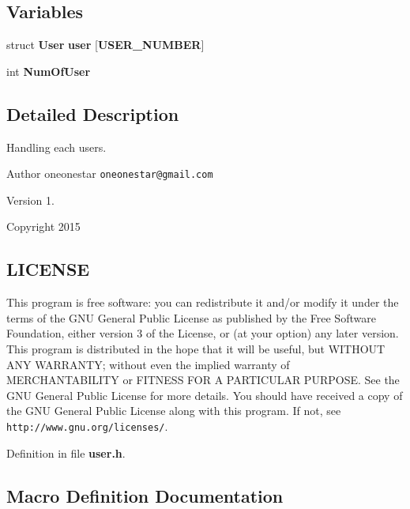 \subsection*{Variables}
\begin{DoxyCompactItemize}
\item 
struct {\bf User} {\bf user} [{\bf U\+S\+E\+R\+\_\+\+N\+U\+M\+B\+E\+R}]
\item 
int {\bf Num\+Of\+User}
\end{DoxyCompactItemize}


\subsection{Detailed Description}
Handling each users. 

\begin{DoxyAuthor}{Author}
oneonestar {\tt oneonestar@gmail.\+com} 
\end{DoxyAuthor}
\begin{DoxyVersion}{Version}
1. 
\end{DoxyVersion}
\begin{DoxyCopyright}{Copyright}
2015
\end{DoxyCopyright}
\subsection{L\+I\+C\+E\+N\+S\+E}\label{user_8h_LICENSE}
This program is free software\+: you can redistribute it and/or modify it under the terms of the G\+N\+U General Public License as published by the Free Software Foundation, either version 3 of the License, or (at your option) any later version. This program is distributed in the hope that it will be useful, but W\+I\+T\+H\+O\+U\+T A\+N\+Y W\+A\+R\+R\+A\+N\+T\+Y; without even the implied warranty of M\+E\+R\+C\+H\+A\+N\+T\+A\+B\+I\+L\+I\+T\+Y or F\+I\+T\+N\+E\+S\+S F\+O\+R A P\+A\+R\+T\+I\+C\+U\+L\+A\+R P\+U\+R\+P\+O\+S\+E. See the G\+N\+U General Public License for more details. You should have received a copy of the G\+N\+U General Public License along with this program. If not, see {\tt http\+://www.\+gnu.\+org/licenses/}. 

Definition in file {\bf user.\+h}.



\subsection{Macro Definition Documentation}
